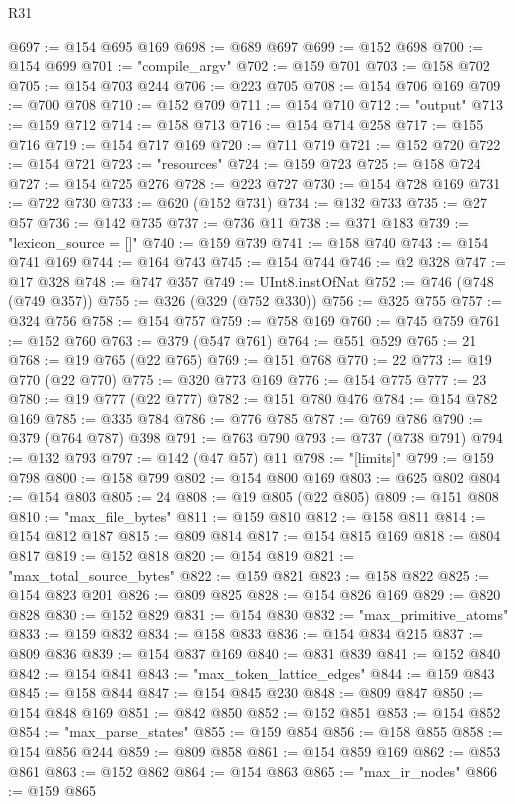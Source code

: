 \begin{lexlean}{R31}
\begin{coremodule}
@697 := @154 @695 @169
@698 := @689 @697
@699 := @152 @698
@700 := @154 @699
@701 := "compile_argv"
@702 := @159 @701
@703 := @158 @702
@705 := @154 @703 @244
@706 := @223 @705
@708 := @154 @706 @169
@709 := @700 @708
@710 := @152 @709
@711 := @154 @710
@712 := "output"
@713 := @159 @712
@714 := @158 @713
@716 := @154 @714 @258
@717 := @155 @716
@719 := @154 @717 @169
@720 := @711 @719
@721 := @152 @720
@722 := @154 @721
@723 := "resources"
@724 := @159 @723
@725 := @158 @724
@727 := @154 @725 @276
@728 := @223 @727
@730 := @154 @728 @169
@731 := @722 @730
@733 := @620 (@152 @731)
@734 := @132 @733
@735 := @27 @57
@736 := @142 @735
@737 := @736 @11
@738 := @371 @183
@739 := "lexicon_source = []"
@740 := @159 @739
@741 := @158 @740
@743 := @154 @741 @169
@744 := @164 @743
@745 := @154 @744
@746 := @2 @328
@747 := @17 @328
@748 := @747 @357
@749 := UInt8.instOfNat
@752 := @746 (@748 (@749 @357))
@755 := @326 (@329 (@752 @330))
@756 := @325 @755
@757 := @324 @756
@758 := @154 @757
@759 := @758 @169
@760 := @745 @759
@761 := @152 @760
@763 := @379 (@547 @761)
@764 := @551 @529
@765 := 21
@768 := @19 @765 (@22 @765)
@769 := @151 @768
@770 := 22
@773 := @19 @770 (@22 @770)
@775 := @320 @773 @169
@776 := @154 @775
@777 := 23
@780 := @19 @777 (@22 @777)
@782 := @151 @780 @476
@784 := @154 @782 @169
@785 := @335 @784
@786 := @776 @785
@787 := @769 @786
@790 := @379 (@764 @787) @398
@791 := @763 @790
@793 := @737 (@738 @791)
@794 := @132 @793
@797 := @142 (@47 @57) @11
@798 := "[limits]"
@799 := @159 @798
@800 := @158 @799
@802 := @154 @800 @169
@803 := @625 @802
@804 := @154 @803
@805 := 24
@808 := @19 @805 (@22 @805)
@809 := @151 @808
@810 := "max_file_bytes"
@811 := @159 @810
@812 := @158 @811
@814 := @154 @812 @187
@815 := @809 @814
@817 := @154 @815 @169
@818 := @804 @817
@819 := @152 @818
@820 := @154 @819
@821 := "max_total_source_bytes"
@822 := @159 @821
@823 := @158 @822
@825 := @154 @823 @201
@826 := @809 @825
@828 := @154 @826 @169
@829 := @820 @828
@830 := @152 @829
@831 := @154 @830
@832 := "max_primitive_atoms"
@833 := @159 @832
@834 := @158 @833
@836 := @154 @834 @215
@837 := @809 @836
@839 := @154 @837 @169
@840 := @831 @839
@841 := @152 @840
@842 := @154 @841
@843 := "max_token_lattice_edges"
@844 := @159 @843
@845 := @158 @844
@847 := @154 @845 @230
@848 := @809 @847
@850 := @154 @848 @169
@851 := @842 @850
@852 := @152 @851
@853 := @154 @852
@854 := "max_parse_states"
@855 := @159 @854
@856 := @158 @855
@858 := @154 @856 @244
@859 := @809 @858
@861 := @154 @859 @169
@862 := @853 @861
@863 := @152 @862
@864 := @154 @863
@865 := "max_ir_nodes"
@866 := @159 @865

\end{coremodule}
\end{lexlean}
